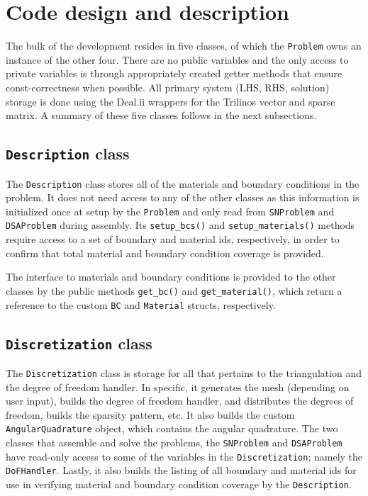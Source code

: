 \documentclass{article}
\begin{document}
\section{Code design and description}

The bulk of the development resides in five classes, of which the \texttt{Problem} owns an instance of the other four. There are no public variables and the only access to private variables is through appropriately created getter methods that ensure const-correctness when possible. All primary system (LHS, RHS, solution) storage is done using the Deal.ii wrappers for the Trilinos vector and sparse matrix. A summary of these five classes follows in the next subsections.

\subsection{\texttt{Description} class}

The \texttt{Description} class stores all of the materials and boundary conditions in the problem. It does not need access to any of the other classes as this information is initialized once at setup by the \texttt{Problem} and only read from \texttt{SNProblem} and \texttt{DSAProblem} during assembly. Its \texttt{setup\_bcs()} and \texttt{setup\_materials()} methods require access to a set of boundary and material ids, respectively, in order to confirm that total material and boundary condition coverage is provided.

The interface to materials and boundary conditions is provided to the other classes by the public methods \texttt{get\_bc()} and \texttt{get\_material()}, which return a reference to the custom \texttt{BC} and \texttt{Material} structs, respectively.

\subsection{\texttt{Discretization} class}

The \texttt{Discretization} class is storage for all that pertains to the triangulation and the degree of freedom handler. In specific, it generates the mesh (depending on user input), builds the degree of freedom handler, and distributes the degrees of freedom, builds the sparsity pattern, etc. It also builds the custom \texttt{AngularQuadrature} object, which contains the angular quadrature. The two classes that assemble and solve the problems, the \texttt{SNProblem} and \texttt{DSAProblem} have read-only access to some of the variables in the \texttt{Discretization}; namely the \texttt{DoFHandler}. Lastly, it also builds the listing of all boundary and material ids for use in verifying material and boundary condition coverage by the \texttt{Description}.
\end{document}
